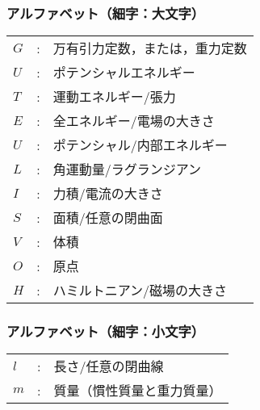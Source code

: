     \subsubsection*{アルファベット（細字：大文字）}
    \begin{tabular}{lll}
        $G$                     &:  & 万有引力定数，または，重力定数                                        \\
        $U$                     &:  & ポテンシャルエネルギー                                                \\
        $T$                     &:  & 運動エネルギー/張力                                                   \\
        $E$                     &:  & 全エネルギー/電場の大きさ                                      \\
        $U$                     &:  & ポテンシャル/内部エネルギー                                 \\
        $L$                     &:  & 角運動量/ラグランジアン                                               \\
        $I$                     &:  & 力積/電流の大きさ                                              \\
        $S$                     &:  & 面積/任意の閉曲面                                                     \\
        $V$                     &:  & 体積                                                                  \\
        $O$                     &:  & 原点                                                                  \\
        $H$                     &:  & ハミルトニアン/磁場の大きさ                            %
    \end{tabular}

    \subsubsection*{アルファベット（細字：小文字）}
    \begin{tabular}{lll}
        $l$                     &:  & 長さ/任意の閉曲線                                                     \\
        $m$                     &:  & 質量（慣性質量と重力質量）                                                   %
    \end{tabular}


